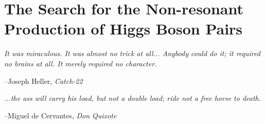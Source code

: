 \chapter{The Search for the Non-resonant Production of Higgs Boson Pairs}
\label{chap:search_hh}


\epigraph{
\textit{It was miraculous. It was almost no trick at all... Anybody could do it; it required no brains at all.
It merely required no character.}
}
{
--Joseph Heller, \textit{Catch-22}
}


\epigraph{
\textit{...the ass will carry his load, but not a double load; ride not a free horse to death.}
}
{
--Miguel de Cervantes, \textit{Don Quixote}
}
